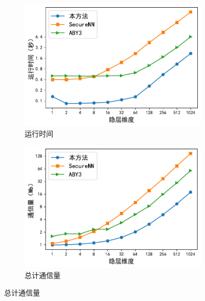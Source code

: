 %
\begin{figure}[h!]
    \centering
    \begin{subfigure}[b]{0.48\linewidth}
    \centering
    \includegraphics[width=\linewidth]{Z_Resources/ss-perm_one-layer-time.pdf}
    \caption{运行时间}
    \end{subfigure}
    \begin{subfigure}[b]{0.48\linewidth}
    \centering
    \includegraphics[width=\linewidth]{Z_Resources/ss-perm_one-layer-comm.pdf}
    \caption{总计通信量}
    \end{subfigure}
    

\end{figure}
